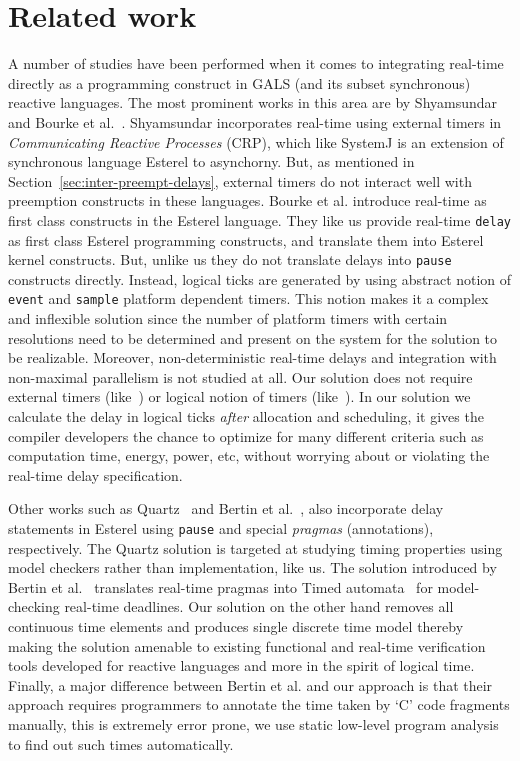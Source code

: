 \section{Related work}
\label{sec:related-work}


A number of studies have been performed when it comes to integrating
real-time directly as a programming construct in GALS (and its subset
synchronous) reactive languages. The most prominent works in this area
are by Shyamsundar~\cite{rsh94} and Bourke et
al.~\cite{Bourke2009a}. Shyamsundar incorporates real-time using
external timers in \textit{Communicating Reactive Processes} (CRP),
which like SystemJ is an extension of synchronous language Esterel to
asynchorny. But, as mentioned in Section~\ref{sec:inter-preempt-delays},
external timers do not interact well with preemption constructs in these
languages. Bourke et al. introduce real-time as first class constructs
in the Esterel language. They like us provide real-time \texttt{delay}
as first class Esterel programming constructs, and translate them into
Esterel kernel constructs. But, unlike us they do not translate delays
into \texttt{pause} constructs directly. Instead, logical ticks are
generated by using abstract notion of \texttt{event} and \texttt{sample}
platform dependent timers. This notion makes it a complex and inflexible
solution since the number of platform timers with certain resolutions
need to be determined and present on the system for the solution to be
realizable. Moreover, non-deterministic real-time delays and integration
with non-maximal parallelism is not studied at all. Our solution does
not require external timers (like~\cite{rsh94}) or logical notion of
timers (like~\cite{Bourke2009a}). In our solution we calculate the delay
in logical ticks \textit{after} allocation and scheduling, it gives the
compiler developers the chance to optimize for many different criteria
such as computation time, energy, power, etc, without worrying about or
violating the real-time delay specification.

Other works such as Quartz~\cite{glog02} and Bertin et
al.~\cite{Bertin:2000:TVR:1947412.1947439}, also incorporate delay
statements in Esterel using \texttt{pause} and special \textit{pragmas}
(annotations), respectively.  The Quartz solution is targeted at
studying timing properties using model checkers rather than
implementation, like us. The solution introduced by Bertin et
al.~\cite{Bertin:2000:TVR:1947412.1947439} translates real-time pragmas
into Timed automata~\cite{alur94} for model-checking real-time
deadlines. Our solution on the other hand removes all continuous time
elements and produces single discrete time model thereby making the
solution amenable to existing functional and real-time verification
tools developed for reactive languages and more in the spirit of logical
time. Finally, a major difference between Bertin et al. and our approach
is that their approach requires programmers to annotate the time taken
by `C' code fragments manually, this is extremely error prone, we use
static low-level program analysis to find out such times automatically.




